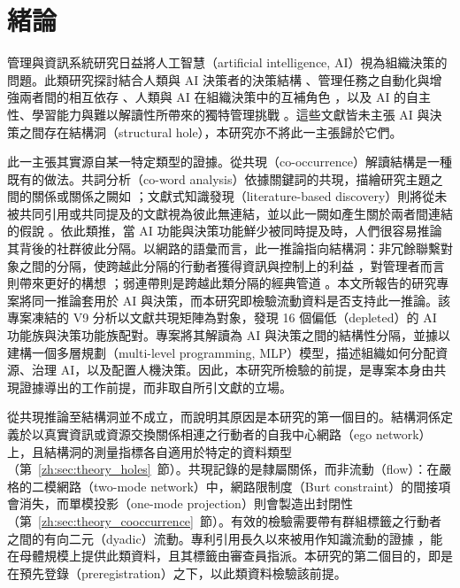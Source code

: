 \chapter{緒論}
\label{zh:sec:intro}

管理與資訊系統研究日益將人工智慧（artificial intelligence, AI）視為組織決策的問題。此類研究探討結合人類與 AI 決策者的決策結構 \citep{shrestha2019organizational}、管理任務之自動化與增強兩者間的相互依存 \citep{raisch2021artificial}、人類與 AI 在組織決策中的互補角色 \citep{jarrahi2018artificial}，以及 AI 的自主性、學習能力與難以解讀性所帶來的獨特管理挑戰 \citep{berente2021managing}。這些文獻皆未主張 AI 與決策之間存在結構洞（structural hole），本研究亦不將此一主張歸於它們。

此一主張其實源自某一特定類型的證據。從共現（co-occurrence）解讀結構是一種既有的做法。共詞分析（co-word analysis）依據關鍵詞的共現，描繪研究主題之間的關係或關係之闕如 \citep{callon1983translations}；文獻式知識發現（literature-based discovery）則將從未被共同引用或共同提及的文獻視為彼此無連結，並以此一闕如產生關於兩者間連結的假說 \citep{swanson1986fish}。依此類推，當 AI 功能與決策功能鮮少被同時提及時，人們很容易推論其背後的社群彼此分隔。以網路的語彙而言，此一推論指向結構洞：非冗餘聯繫對象之間的分隔，使跨越此分隔的行動者獲得資訊與控制上的利益 \citep{burt1992structural}，對管理者而言則帶來更好的構想 \citep{burt2004structural}；弱連帶則是跨越此類分隔的經典管道 \citep{granovetter1973strength}。本文所報告的研究專案將同一推論套用於 AI 與決策，而本研究即檢驗流動資料是否支持此一推論。該專案凍結的 V9 分析以文獻共現矩陣為對象，發現 16 個偏低（depleted）的 AI 功能族與決策功能族配對。專案將其解讀為 AI 與決策之間的結構性分隔，並據以建構一個多層規劃（multi-level programming, MLP）模型，描述組織如何分配資源、治理 AI，以及配置人機決策。因此，本研究所檢驗的前提，是專案本身由共現證據導出的工作前提，而非取自所引文獻的立場。

從共現推論至結構洞並不成立，而說明其原因是本研究的第一個目的。結構洞係定義於以真實資訊或資源交換關係相連之行動者的自我中心網路（ego network）上，且結構洞的測量指標各自適用於特定的資料類型（第~\ref{zh:sec:theory_holes}~節）。共現記錄的是隸屬關係，而非流動（flow）：在嚴格的二模網路（two-mode network）中，網路限制度（Burt constraint）的間接項會消失，而單模投影（one-mode projection）則會製造出封閉性（第~\ref{zh:sec:theory_cooccurrence}~節）。有效的檢驗需要帶有群組標籤之行動者之間的有向二元（dyadic）流動。專利引用長久以來被用作知識流動的證據 \citep{jaffe1993geographic}，能在母體規模上提供此類資料，且其標籤由審查員指派。本研究的第二個目的，即是在預先登錄（preregistration）之下，以此類資料檢驗該前提。

